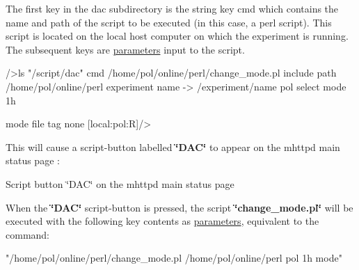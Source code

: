 The first key in the dac subdirectory is the string key cmd which contains the name and path of the script to be executed (in this case, a perl script). This script is located on the local host computer on which the experiment is running. The subsequent keys are \hyperlink{structparameters}{parameters} input to the script. 
\begin{DoxyCode}
/>ls "/script/dac"
cmd                             /home/pol/online/perl/change_mode.pl
include path                    /home/pol/online/perl
experiment name -> /experiment/name
                                pol
select mode                     1h

mode file tag                   none
[local:pol:R]/>  
\end{DoxyCode}


This will cause a script-\/button labelled {\bfseries \char`\"{}DAC\char`\"{}} to appear on the mhttpd main status page : \par
 \begin{center} Script button \char`\"{}DAC\char`\"{} on the mhttpd main status page  \end{center} \par


When the {\bfseries \char`\"{}DAC\char`\"{}} script-\/button is pressed, the script {\bfseries \char`\"{}change\_\-mode.pl\char`\"{}} will be executed with the following key contents as \hyperlink{structparameters}{parameters}, equivalent to the command: 
\begin{DoxyCode}
  "/home/pol/online/perl/change_mode.pl  /home/pol/online/perl pol 1h mode"
\end{DoxyCode}
 \par


